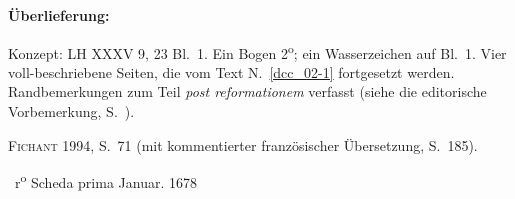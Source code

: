 %
%
%
%
%
\frenchspacing%
%
\begin{ledgroupsized}[r]{120mm}%
\footnotesize%
\pstart%
\noindent\textbf{Überlieferung:}%
\pend%
\end{ledgroupsized}%
\begin{ledgroupsized}[r]{114mm}%
\footnotesize%
\pstart%
\parindent -6mm%
%
Konzept: LH XXXV 9, 23 Bl.~1.
Ein Bogen 2\textsuperscript{o};
ein Wasserzeichen auf Bl.~1. %
Vier voll-beschriebene Seiten, die vom Text N.~\ref{dcc_02-1} %
fortgesetzt werden.
Randbemerkungen zum Teil \textit{post reformationem} verfasst (siehe die editorische Vorbemerkung, S.~).
\pend%
\end{ledgroupsized}
%
\begin{ledgroupsized}[r]{114mm}%
\footnotesize%
\pstart%
\parindent -6mm%
%
\textsc{Fichant} 1994,\cite{01056}
S.~71 (mit kommentierter französischer Übersetzung, S.~185).
\pend%
\end{ledgroupsized}%
%
%
\frenchspacing%
%
%
\vspace*{8mm}%
%
\count{}%
\count{}%
\count{}%
%
\pstart%
\normalsize%
\noindent%
%
~r\textsuperscript{o}\rbrack%
%
\hspace{49.5mm}Scheda\protect{}%
%
prima%
\hspace{37.5mm}
Januar. 1678%
\pend%
\pstart%
\noindent%
